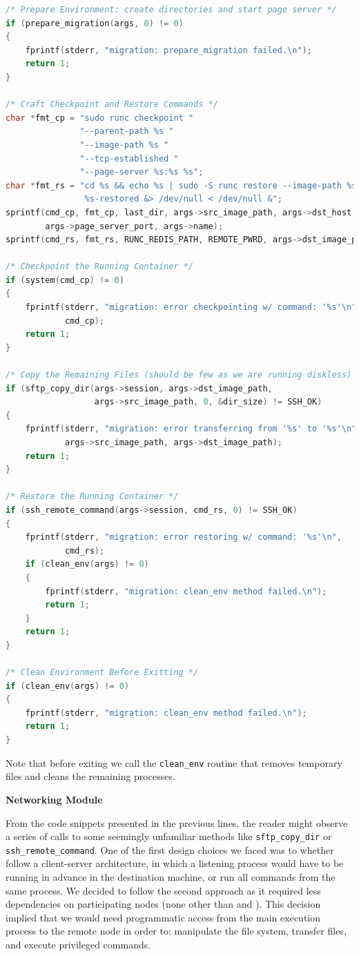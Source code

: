 \begin{lstlisting}[language=C,caption={Snippet for the last (stopping) checkpoint and remote restore.},label={code:last-cp}]
/* Prepare Environment: create directories and start page server */
if (prepare_migration(args, 0) != 0)
{
    fprintf(stderr, "migration: prepare_migration failed.\n");
    return 1;
}

/* Craft Checkpoint and Restore Commands */
char *fmt_cp = "sudo runc checkpoint "
               "--parent-path %s "
               "--image-path %s "
               "--tcp-established "
               "--page-server %s:%s %s";
char *fmt_rs = "cd %s && echo %s | sudo -S runc restore --image-path %s \
                %s-restored &> /dev/null < /dev/null &";
sprintf(cmd_cp, fmt_cp, last_dir, args->src_image_path, args->dst_host,
        args->page_server_port, args->name);
sprintf(cmd_rs, fmt_rs, RUNC_REDIS_PATH, REMOTE_PWRD, args->dst_image_path, args->name);

/* Checkpoint the Running Container */
if (system(cmd_cp) != 0)
{
    fprintf(stderr, "migration: error checkpointing w/ command: '%s'\n",
            cmd_cp);
    return 1;
}

/* Copy the Remaining Files (should be few as we are running diskless) */
if (sftp_copy_dir(args->session, args->dst_image_path, 
                  args->src_image_path, 0, &dir_size) != SSH_OK)
{
    fprintf(stderr, "migration: error transferring from '%s' to '%s'\n",
            args->src_image_path, args->dst_image_path);
    return 1;
}

/* Restore the Running Container */
if (ssh_remote_command(args->session, cmd_rs, 0) != SSH_OK)
{
    fprintf(stderr, "migration: error restoring w/ command: '%s'\n",
            cmd_rs);
    if (clean_env(args) != 0)
    {
        fprintf(stderr, "migration: clean_env method failed.\n");
        return 1;
    }
    return 1;
}

/* Clean Environment Before Exitting */
if (clean_env(args) != 0)
{
    fprintf(stderr, "migration: clean_env method failed.\n");
    return 1;
}
\end{lstlisting}
Note that before exiting we call the \texttt{clean\_env} routine that removes temporary files and cleans the remaining processes.

\textbf{Networking Module}

From the code snippets presented in the previous lines, the reader might observe a series of calls to some seemingly unfamiliar methods like \texttt{sftp\_copy\_dir} or \texttt{ssh\_remote\_command}.
One of the first design choices we faced was to whether follow a client-server architecture, in which a listening process would have to be running in advance in the destination machine, or run all commands from the same process.
We decided to follow the second approach as it required less dependencies on participating nodes (none other than \criu and \runc).
This decision implied that we would need programmatic access from the main execution process to the remote node in order to: manipulate the file system, transfer files, and execute privileged commands.

